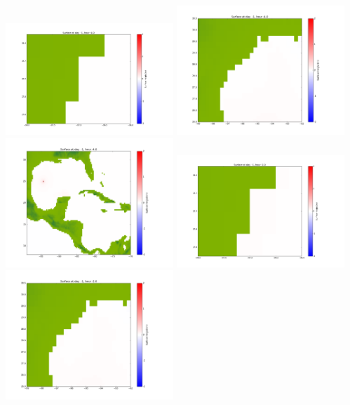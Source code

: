 \documentclass[11pt]{article}
\begin{document}
\vskip 10pt 
\includegraphics[width=0.475\textwidth]{frame0010fig1001.png}
\includegraphics[width=0.475\textwidth]{frame0010fig1002.png}
\vskip 10pt 
\includegraphics[width=0.475\textwidth]{frame0010fig1003.png}
\vskip 10pt 
\includegraphics[width=0.475\textwidth]{frame0011fig1001.png}
\includegraphics[width=0.475\textwidth]{frame0011fig1002.png}
\end{document}
